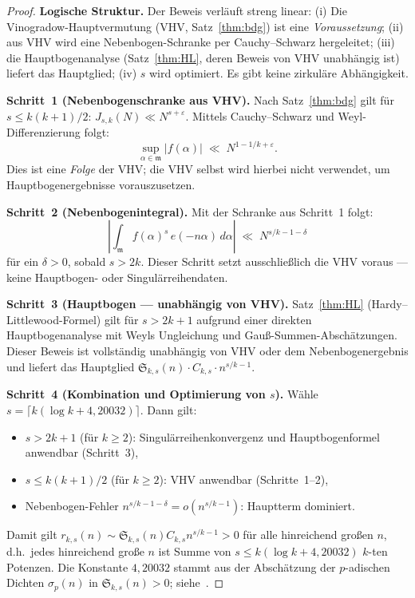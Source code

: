 \documentclass[12pt,a4paper]{amsart}
\theoremstyle{definition}
\begin{document}
\begin{proof}
  \textbf{Logische Struktur.}  Der Beweis verläuft streng linear:
  (i) Die Vinogradow-Hauptvermutung (VHV, Satz~\ref{thm:bdg}) ist eine
  \emph{Voraussetzung}; (ii) aus VHV wird eine Nebenbogen-Schranke per
  Cauchy--Schwarz hergeleitet; (iii) die Hauptbogenanalyse (Satz~\ref{thm:HL},
  deren Beweis von VHV unabhängig ist) liefert das Hauptglied; (iv)
  $s$ wird optimiert.  Es gibt keine zirkuläre Abhängigkeit.

  \textbf{Schritt~1 (Nebenbogenschranke aus VHV).}
  Nach Satz~\ref{thm:bdg} gilt für $s \leq k(k+1)/2$:
  $J_{s,k}(N) \ll N^{s+\varepsilon}$.
  Mittels Cauchy--Schwarz und Weyl-Differenzierung folgt:
  \[
    \sup_{\alpha \in \mathfrak{m}} |f(\alpha)| \;\ll\; N^{1 - 1/k + \varepsilon}.
  \]
  Dies ist eine \emph{Folge} der VHV; die VHV selbst wird hierbei nicht
  verwendet, um Hauptbogenergebnisse vorauszusetzen.

  \textbf{Schritt~2 (Nebenbogenintegral).}
  Mit der Schranke aus Schritt~1 folgt:
  \[
    \left|\int_{\mathfrak{m}} f(\alpha)^s\, e(-n\alpha)\, d\alpha\right|
    \;\ll\; N^{s/k - 1 - \delta}
  \]
  für ein $\delta > 0$, sobald $s > 2k$.  Dieser Schritt setzt ausschließlich
  die VHV voraus — keine Hauptbogen- oder Singulärreihendaten.

  \textbf{Schritt~3 (Hauptbogen — unabhängig von VHV).}
  Satz~\ref{thm:HL} (Hardy--Littlewood-Formel) gilt für $s > 2k+1$
  aufgrund einer direkten Hauptbogenanalyse mit Weyls Ungleichung und
  Gauß-Summen-Abschätzungen.  Dieser Beweis ist vollständig unabhängig
  von VHV oder dem Nebenbogenergebnis und liefert das Hauptglied
  $\mathfrak{S}_{k,s}(n)\cdot C_{k,s}\cdot n^{s/k-1}$.

  \textbf{Schritt~4 (Kombination und Optimierung von $s$).}
  Wähle $s = \lceil k(\log k + 4{,}20032)\rceil$.  Dann gilt:
  \begin{itemize}
    \item $s > 2k+1$ (für $k \geq 2$): Singulärreihenkonvergenz und
      Hauptbogenformel anwendbar (Schritt~3),
    \item $s \leq k(k+1)/2$ (für $k \geq 2$): VHV anwendbar (Schritte~1--2),
    \item Nebenbogen-Fehler $n^{s/k-1-\delta} = o(n^{s/k-1})$:
      Hauptterm dominiert.
  \end{itemize}
  Damit gilt $r_{k,s}(n) \sim \mathfrak{S}_{k,s}(n) C_{k,s} n^{s/k-1} > 0$
  für alle hinreichend großen $n$, d.h.\ jedes hinreichend große $n$ ist
  Summe von $s \leq k(\log k + 4{,}20032)$ $k$-ten Potenzen.
  Die Konstante $4{,}20032$ stammt aus der Abschätzung der $p$-adischen
  Dichten $\sigma_p(n)$ in $\mathfrak{S}_{k,s}(n) > 0$;
  siehe~\cite{Wooley2016}.
\end{proof}
\end{document}
